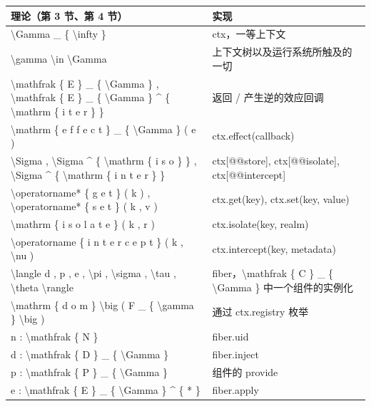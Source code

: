 \documentclass[
  10
]{article}
\newcounter{none} %
\begin{document}
{\def\LTcaptype{none} %
\begin{longtable}[]{@{}|l|l|@{}}
\toprule\noalign{}
\endhead
\bottomrule\noalign{}
\endlastfoot
\hline
理论（第 3 节、第 4 节） & 实现 \\
\hline
\textbackslash Gamma \_ \{ \textbackslash infty \} & ctx，一等上下文 \\
\hline
\textbackslash gamma \textbackslash in \textbackslash Gamma & 上下文树以及运行系统所触及的一切 \\
\hline
\textbackslash mathfrak \{ E \} \_ \{ \textbackslash Gamma \} , \textbackslash mathfrak \{ E \} \_ \{ \textbackslash Gamma \} \^{} \{ \textbackslash mathrm \{ i t e r \} \} & 返回 / 产生逆的效应回调 \\
\hline
\textbackslash mathrm \{ e f f e c t \} \_ \{ \textbackslash Gamma \} ( e ) & ctx.effect(callback) \\
\hline
\textbackslash Sigma , \textbackslash Sigma \^{} \{ \textbackslash mathrm \{ i s o \} \} , \textbackslash Sigma \^{} \{ \textbackslash mathrm \{ i n t e r \} \} & ctx{[}@@store{]}, ctx{[}@@isolate{]}, ctx{[}@@intercept{]} \\
\hline
\textbackslash operatorname* \{ g e t \} ( k ) , \textbackslash operatorname* \{ s e t \} ( k , v ) & ctx.get(key), ctx.set(key, value) \\
\hline
\textbackslash mathrm \{ i s o l a t e \} ( k , r ) & ctx.isolate(key, realm) \\
\hline
\textbackslash operatorname \{ i n t e r c e p t \} ( k , \textbackslash nu ) & ctx.intercept(key, metadata) \\
\hline
\textbackslash langle d , p , e , \textbackslash pi , \textbackslash sigma , \textbackslash tau , \textbackslash theta \textbackslash rangle & fiber，\textbackslash mathfrak \{ C \} \_ \{ \textbackslash Gamma \} 中一个组件的实例化 \\
\hline
\textbackslash mathrm \{ d o m \} \textbackslash big ( F \_ \{ \textbackslash gamma \} \textbackslash big ) & 通过 ctx.registry 枚举 \\
\hline
n : \textbackslash mathfrak \{ N \} & fiber.uid \\
\hline
d : \textbackslash mathfrak \{ D \} \_ \{ \textbackslash Gamma \} & fiber.inject \\
\hline
p : \textbackslash mathfrak \{ P \} \_ \{ \textbackslash Gamma \} & 组件的 provide \\
\hline
e : \textbackslash mathfrak \{ E \} \_ \{ \textbackslash Gamma \} \^{} \{ * \} & fiber.apply \\

\end{longtable}}
\end{document}

